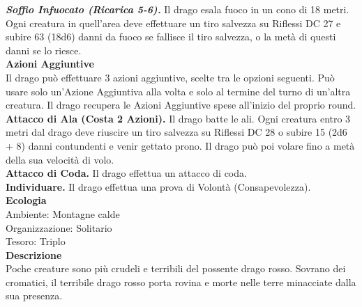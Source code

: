 \begin{multicols}{2}
\emph{\textbf{Soffio Infuocato (Ricarica 5-6).}} Il drago esala fuoco in  un cono di 18 metri. Ogni creatura in quell'area deve effettuare un tiro salvezza su Riflessi DC  27 e subire 63 (18d6) danni da fuoco se fallisce il tiro salvezza, o la metà di questi danni se lo riesce.\\
\textbf{Azioni Aggiuntive}\\
Il drago può effettuare 3 azioni aggiuntive, scelte tra le opzioni seguenti. Può usare solo un'Azione Aggiuntiva alla volta e solo al termine del turno di un'altra creatura. Il drago recupera le Azioni Aggiuntive spese all'inizio del proprio round.\\
\textbf{Attacco di Ala (Costa 2 Azioni).} Il drago batte le ali. Ogni creatura entro 3 metri dal drago deve riuscire un tiro salvezza su Riflessi DC  28 o subire 15 (2d6 + 8) danni contundenti e venir gettato prono. Il drago può poi volare fino a metà della sua velocità di volo.\\
\textbf{Attacco di Coda.} Il drago effettua un attacco di coda.\\
\textbf{Individuare.} Il drago effettua una prova di Volontà (Consapevolezza).\\
\textbf{Ecologia}\\
Ambiente: Montagne calde\\
Organizzazione: Solitario\\
Tesoro: Triplo\\
\textbf{Descrizione}\\
Poche creature sono più crudeli e terribili del possente drago rosso. Sovrano dei cromatici, il terribile drago rosso porta rovina e morte nelle terre minacciate dalla sua presenza.\\


\end{multicols}
